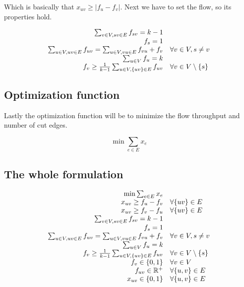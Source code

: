 \documentclass{article}
\theoremstyle{plain}
\theoremstyle{plain}
\theoremstyle{remark}
\begin{document}
	Which is basically that $x_{uv} \geq |f_u - f_v|$. Next we have to set the flow, so its properties hold.
	
	$$
	\begin{array}{r l}
		\sum_{v \in V, sv \in E} f_{sv} = k-1 \\
		f_s = 1 \\
		\sum_{u \in V, uv \in E} f_{uv} = \sum_{u \in V, vu \in E} f_{vu} + f_v & \forall v \in V, s \neq v \\
		\sum_{u \in V} f_u = k \\
		f_{v} \geq \frac{1}{k-1} \sum_{u \in V, \{uv\} \in E} f_{uv} & \forall v \in V \setminus \{s\}
	\end{array}
	$$
	
	\subsection{Optimization function}
	
	Lastly the optimization function will be to minimize the flow throughput and number of cut edges.
	
	$$
	\min \sum_{e \in E} x_e %
	$$
	
	\subsection{The whole formulation}
	
	\begin{equation}
		\begin{array}{r l}
			\min \sum_{e \in E} x_e \\
			x_{uv} \geq f_u - f_v & \forall \{uv\} \in E\\
			x_{uv} \geq f_v - f_u & \forall \{uv\} \in E\\
			\sum_{v \in V, sv \in E} f_{sv} = k-1 \\
			f_s = 1 \\
			\sum_{u \in V, uv \in E} f_{uv} = \sum_{u \in V, vu \in E} f_{vu} + f_v & \forall v \in V, s \neq v \\
			\sum_{u \in V} f_u = k \\
			f_{v} \geq \frac{1}{k-1} \sum_{u \in V, \{uv\} \in E} f_{uv} & \forall v \in V \setminus \{s\} \\
			f_v \in \{0,1\} & \forall v \in V \\
			f_{uv} \in \mathbb{R}^+ & \forall \{u,v\} \in E \\
			x_{uv} \in \{0,1\} & \forall \{u,v\} \in E
		\end{array}
	\end{equation}
	
\end{document}

